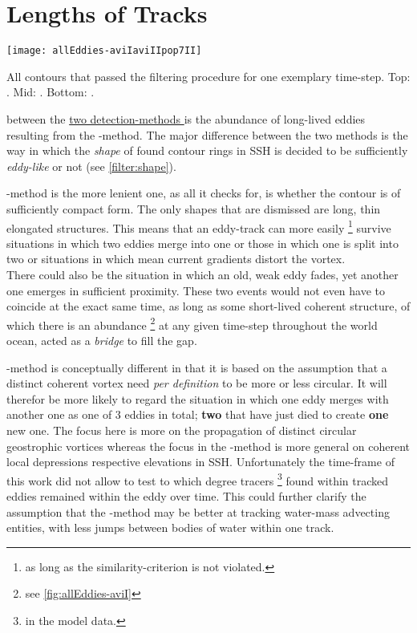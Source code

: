 \section{Lengths of Tracks}
\begin{marginfigure}
	\texttt{[image: allEddies-aviIaviIIpop7II]}
	\caption{All contours that passed the filtering procedure for one exemplary time-step. Top: \aviI. Mid: \aviII. Bottom: \popSevenII.}
	\label{fig:allEddies-aviIaviIIpop7II}
\end{marginfigure}
 between the \href{box:MI}{two detection-methods } is the abundance of long-lived eddies resulting from the \MI-method. The major difference between the two methods is the way in which the \textit{shape} of found contour rings in SSH is decided to be sufficiently \textit{eddy-like} or not (see \cref{filter:shape}).

 \MI-method is the more lenient one, as all it checks for, is whether the contour is of sufficiently compact form. The only shapes that are dismissed are long, thin elongated structures. This means that \eg an eddy-track can more easily \footnote{as long as the similarity-criterion is not violated.} survive situations in which two eddies merge into one or those in which one is split into two or situations in which mean current gradients distort the vortex.\\ There could also be the situation in which an old, weak eddy fades, yet another one emerges in sufficient proximity. These two events would not even have to coincide at the exact same time, as long as some short-lived coherent structure, of which there is an abundance \footnote{see \cref{fig:allEddies-aviI}} at any given time-step throughout the world ocean, acted as a \textit{bridge} to fill the gap.


 \MII-method is conceptually different in that it is based on the assumption that a distinct coherent vortex need \textit{per definition} to be more or less circular. It will therefor be more likely to regard \eg the situation in which one eddy merges with another one as one of 3 eddies in total; \textbf{two} that have just died to create \textbf{one} new one.
The focus here is more on the propagation of distinct circular geostrophic vortices whereas the focus in the \MI-method is more general on coherent local depressions respective elevations in SSH. Unfortunately the time-frame of this work did not allow to test to which degree tracers \footnote{in the model data.} found within tracked eddies remained within the eddy over time. This could further clarify the assumption that the \MI-method may be better at tracking water-mass advecting entities, with less jumps between bodies of water within one track.

